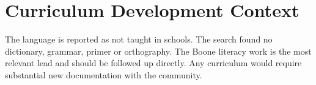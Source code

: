 \documentclass[12pt]{article}
\begin{document}
\section{Curriculum Development Context}
The language is reported as not taught in schools. The search found no dictionary, grammar, primer or orthography. The Boone literacy work is the most relevant lead and should be followed up directly. Any curriculum would require substantial new documentation with the community.
\end{document}
